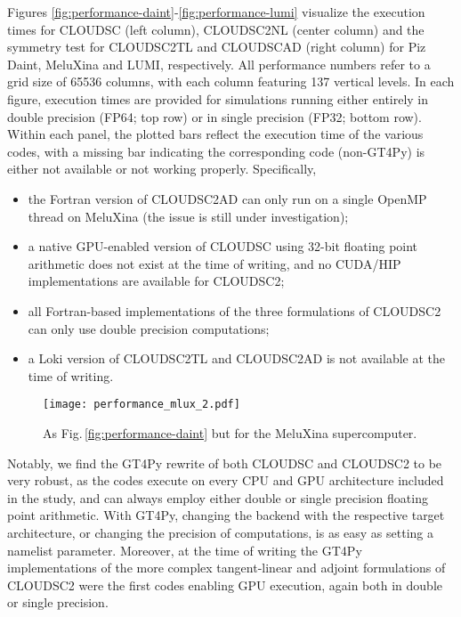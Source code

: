 \documentclass[main.tex]{subfiles}
\begin{document}
        Figures \ref{fig:performance-daint}-\ref{fig:performance-lumi} visualize the execution times for CLOUDSC (left column), CLOUDSC2NL  (center column) and the symmetry test for CLOUDSC2TL and CLOUDSCAD (right column) for Piz Daint, MeluXina and LUMI, respectively. All performance numbers refer to a grid size of 65536 columns, with each column featuring 137 vertical levels. In each figure, execution times are provided for simulations running either entirely in double precision (FP64; top row) or in single precision (FP32; bottom row). Within each panel, the plotted bars reflect the execution time of the various codes, with a missing bar indicating the corresponding code (non-GT4Py) is either not available or not working properly. Specifically,
        \begin{itemize}
            \item the Fortran version of CLOUDSC2AD can only run on a single OpenMP thread on MeluXina (the issue is still under investigation);
            \item a native GPU-enabled version of CLOUDSC using 32-bit floating point arithmetic does not exist at the time of writing, and no CUDA/HIP implementations are available for CLOUDSC2;
            \item all Fortran-based implementations of the three formulations of CLOUDSC2 can only use double precision computations;
            \item a Loki version of CLOUDSC2TL and CLOUDSC2AD is not available at the time of writing.
        \end{itemize}
        
        \begin{figure}[t!]
            \centering
            \texttt{[image: performance\_mlux\_2.pdf]}
            \caption{As Fig.\,\ref{fig:performance-daint} but for the MeluXina supercomputer.}
            \label{fig:performance-mlux}
        \end{figure}

        \noindent Notably, we find the GT4Py rewrite of both CLOUDSC and CLOUDSC2 to be very robust, as the codes execute on every CPU and GPU architecture included in the study, and can always employ either double or single precision floating point arithmetic. With GT4Py, changing the backend with the respective target architecture, or changing the precision of computations, is as easy as setting a namelist parameter. Moreover, at the time of writing the GT4Py implementations of the more complex tangent-linear and adjoint formulations of CLOUDSC2 were the first codes enabling GPU execution, again both in double or single precision.
\end{document}
